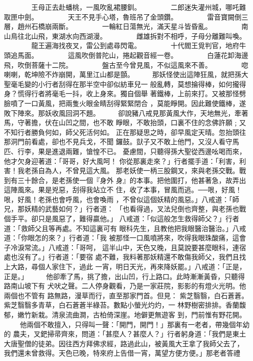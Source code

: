 \begin{pinyinscope}
{　　　　王母正去赴蟠桃，一風吹亂裙腰釧。
　　　　二郎迷失灌州城，哪吒難取匣中劍。
　　　　天王不見手心塔，魯班吊了金頭鑽。
　　　　雷音寶闕倒三層，趙州石橋崩兩斷。
　　　　一輪紅日蕩無光，滿天星斗皆昏亂。
　　　　南山鳥往北山飛，東湖水向西湖漫。
　　　　雌雄拆對不相呼，子母分離難叫喚。
　　　　龍王遍海找夜叉，雷公到處尋閃電。
　　　　十代閻王覓判官，地府牛頭追馬面。
　　　　這風吹倒普陀山，捲起觀音經一卷。
　　　　白蓮花卸海邊飛，吹倒菩薩十二院。
　　　　盤古至今曾見風，不似這風來不善。
　　　　唿喇喇，乾坤險不炸崩開，萬里江山都是顫。
　　
那妖怪使出這陣狂風，就把孫大聖毫毛變的小行者刮得在那半空中卻似紡車兒一
般亂轉，莫想掄得棒，如何攏得身？慌得行者將毫毛一抖，收上身來。獨自個舉
著鐵棒，上前來打。又被那怪劈臉噴了一口黃風，把兩隻火眼金睛刮得緊緊閉合
，莫能睜開。因此難使鐵棒，遂敗下陣來。那妖收風回洞不題。
　　
卻說豬八戒見那黃風大作，天地無光，牽著馬，守著擔，伏在山凹之間，也不敢
睜眼，不敢抬頭，口裏不住的念佛許願﹔又不知行者勝負何如，師父死活何如。
正在那疑思之時，卻早風定天晴。忽抬頭往那洞門前看處，卻也不見兵戈，不聞
鑼鼓。獃子又不敢上他門，又沒人看守馬匹、行李，果是進退兩難，愴惶不已。
憂慮間，只聽得孫大聖從西邊吆喝而來，他才欠身迎著道：「哥哥，好大風呵！
你從那裏走來？」行者擺手道：「利害，利害！我老孫自為人，不曾見這大風。
那老妖使一柄三股鋼叉，來與老孫交戰。戰到有三十餘合，是老孫使一個『身外
身』的本事。把他圍打，他甚著急，故弄出這陣風來。果是兇惡，刮得我站立不
住，收了本事，冒風而逃。──哏，好風！哏，好風！老孫也會呼風，也會喚雨
，不曾似這個妖精的風惡。」八戒道：「師兄，那妖精的武藝如何？」行者道：
「也看得過，叉法兒倒也齊整，與老孫也戰個手平。卻只是風惡了，難得贏他。」
八戒道：「似這般怎生救得師父？」行者道：「救師父且等再處。不知這裏可有
眼科先生，且教他把我眼醫治醫治。」八戒道：「你眼怎的來？」行者道：「我
被那怪一口風噴將來，吹得我眼珠酸痛，這會子冷淚常流。」八戒道：「哥呵，
這半山中，天色又晚，且莫說要甚麼眼科，連宿處也沒有了。」行者道：「要宿
處不難，我料著那妖精還不敢傷我師父，我們且找上大路，尋個人家住下，過此
一宵，明日天光，再來降妖罷。」八戒道：「正是，正是。」
　　
他卻牽了馬，挑了擔，出山凹，行上路口。此時漸漸黃昏，只聽得路南山坡下有
犬吠之聲。二人停身觀看，乃是一家莊院，影影的有燈火光明。他兩個也不管有
路無路，漫草而行，直至那家門首。但見：
紫芝翳翳，白石蒼蒼。紫芝翳翳多青草，白石蒼蒼半綠苔。數點小螢光灼灼，一
林野樹密排排。香蘭馥郁，嫩竹新栽。清泉流曲澗，古柏倚深崖。地僻更無遊客
到，門前惟有野花開。
　　
他兩個不敢擅入，只得叫一聲：「開門，開門！」那裏有一老者，帶幾個年幼的
農夫，叉鈀掃帚齊來，問道：「甚麼人？甚麼人？」行者躬身道：「我們是東土
大唐聖僧的徒弟。因往西方拜佛求經，路過此山，被黃風大王拿了我師父去了，
我們還未曾救得。天色已晚，特來府上告借一宵，萬望方便方便。」那老者答禮
}
\end{pinyinscope}
